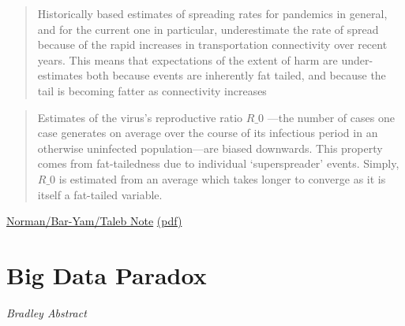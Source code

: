 \documentclass[
]{book}
\begin{document}
\begin{quote}
Historically based estimates of spreading
rates for pandemics in general, and for the current one in
particular, underestimate the rate of spread because of the
rapid increases in transportation connectivity over recent years.
This means that expectations of the extent of harm are under-
estimates both because events are inherently fat tailed, and
because the tail is becoming fatter as connectivity increases
\end{quote}

\begin{quote}
Estimates of the virus's reproductive
ratio \(R\_{0}\) ---the number of cases one case generates on average
over the course of its infectious period in an otherwise
uninfected population---are biased downwards. This property
comes from fat-tailedness due to individual `superspreader'
events. Simply,\(R\_{0}\) is estimated from an average which takes
longer to converge as it is itself a fat-tailed variable.
\end{quote}

\href{https://necsi.edu/systemic-risk-of-pandemic-via-novel-pathogens-coronavirus-\%20a-note}{Norman/Bar-Yam/Taleb Note}
\href{/pdf/Joseph_Norman_2020_Systemic_Risk_of_Pandemic_via_Novel_Pathogenes.pdf}{(pdf)}

\hypertarget{big-data-paradox}{%
\chapter{Big Data Paradox}\label{big-data-paradox}}

\emph{Bradley Abstract}
\end{document}
